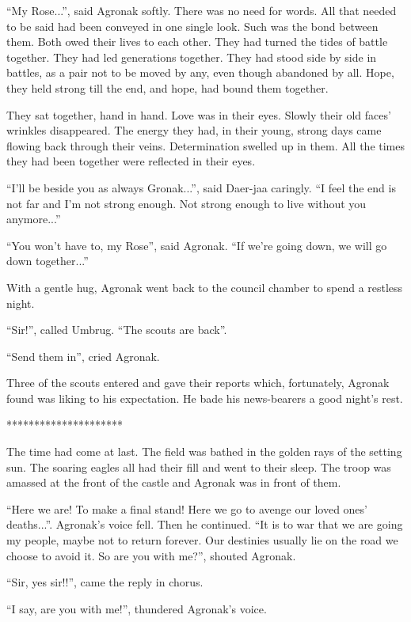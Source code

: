 \documentclass[twoside,11pt,titlepage]{article}
\begin{document}
``My Rose...'', said Agronak softly. There was no need for words. All that needed to be said had been conveyed in one single look. Such was the bond between them. Both owed their lives to each other. They had turned the tides of battle together. They had led generations together. They had stood side by side in battles, as a pair not to be moved by any, even though abandoned by all. Hope, they held strong till the end, and hope, had bound them together.

They sat together, hand in hand. Love was in their eyes. Slowly their old faces' wrinkles disappeared. The energy they had, in their young, strong days came flowing back through their veins. Determination swelled up in them. All the times they had been together were reflected in their eyes.

``I'll be beside you as always Gronak...'', said Daer-jaa caringly. ``I feel the end is not far and I'm not strong enough. Not strong enough to live without you anymore...''

``You won't have to, my Rose'', said Agronak. ``If we're going down, we will go down together...''

With a gentle hug, Agronak went back to the council chamber to spend a restless night.

``Sir!'', called Umbrug. ``The scouts are back''.

``Send them in'', cried Agronak.

Three of the scouts entered and gave their reports which, fortunately, Agronak found was liking to his expectation. He bade his news-bearers a good night's rest.

\bigskip
\begin{center}
*********************
\end{center}

The time had come at last. The field was bathed in the golden rays of the setting sun. The soaring eagles all had their fill and went to their sleep. The troop was amassed at the front of the castle and Agronak was in front of them.

``Here we are! To make a final stand! Here we go to avenge our loved ones' deaths...''. Agronak's voice fell. Then he continued. ``It is to war that we are going my people, maybe not to return forever. Our destinies usually lie on the road we choose to avoid it. So are you with me?'', shouted Agronak.

``Sir, yes sir!!'', came the reply in chorus.

``I say, are you with me!'', thundered Agronak's voice.
\end{document}
